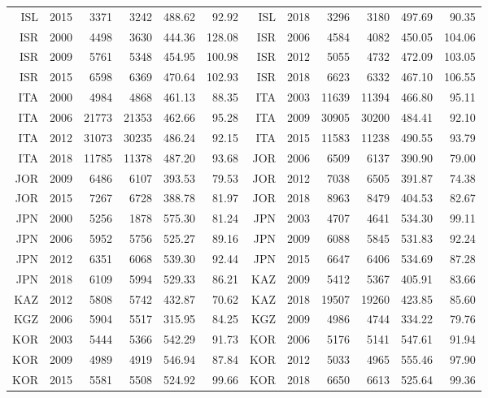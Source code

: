 {\begin{longtable}{r|r|r|r|r|r||r|r|r|r|r|r}
    ISL   & 2015  & 3371  & 3242  & 488.62 & 92.92 & ISL   & 2018  & 3296  & 3180  & 497.69 & 90.35 \\
    ISR   & 2000  & 4498  & 3630  & 444.36 & 128.08 & ISR   & 2006  & 4584  & 4082  & 450.05 & 104.06 \\
    ISR   & 2009  & 5761  & 5348  & 454.95 & 100.98 & ISR   & 2012  & 5055  & 4732  & 472.09 & 103.05 \\
    ISR   & 2015  & 6598  & 6369  & 470.64 & 102.93 & ISR   & 2018  & 6623  & 6332  & 467.10 & 106.55 \\
    ITA   & 2000  & 4984  & 4868  & 461.13 & 88.35 & ITA   & 2003  & 11639 & 11394 & 466.80 & 95.11 \\
    ITA   & 2006  & 21773 & 21353 & 462.66 & 95.28 & ITA   & 2009  & 30905 & 30200 & 484.41 & 92.10 \\
    ITA   & 2012  & 31073 & 30235 & 486.24 & 92.15 & ITA   & 2015  & 11583 & 11238 & 490.55 & 93.79 \\
    ITA   & 2018  & 11785 & 11378 & 487.20 & 93.68 & JOR   & 2006  & 6509  & 6137  & 390.90 & 79.00 \\
    JOR   & 2009  & 6486  & 6107  & 393.53 & 79.53 & JOR   & 2012  & 7038  & 6505  & 391.87 & 74.38 \\
    JOR   & 2015  & 7267  & 6728  & 388.78 & 81.97 & JOR   & 2018  & 8963  & 8479  & 404.53 & 82.67 \\
    JPN   & 2000  & 5256  & 1878  & 575.30 & 81.24 & JPN   & 2003  & 4707  & 4641  & 534.30 & 99.11 \\
    JPN   & 2006  & 5952  & 5756  & 525.27 & 89.16 & JPN   & 2009  & 6088  & 5845  & 531.83 & 92.24 \\
    JPN   & 2012  & 6351  & 6068  & 539.30 & 92.44 & JPN   & 2015  & 6647  & 6406  & 534.69 & 87.28 \\
    JPN   & 2018  & 6109  & 5994  & 529.33 & 86.21 & KAZ   & 2009  & 5412  & 5367  & 405.91 & 83.66 \\
    KAZ   & 2012  & 5808  & 5742  & 432.87 & 70.62 & KAZ   & 2018  & 19507 & 19260 & 423.85 & 85.60 \\
    KGZ   & 2006  & 5904  & 5517  & 315.95 & 84.25 & KGZ   & 2009  & 4986  & 4744  & 334.22 & 79.76 \\
    KOR   & 2003  & 5444  & 5366  & 542.29 & 91.73 & KOR   & 2006  & 5176  & 5141  & 547.61 & 91.94 \\
    KOR   & 2009  & 4989  & 4919  & 546.94 & 87.84 & KOR   & 2012  & 5033  & 4965  & 555.46 & 97.90 \\
    KOR   & 2015  & 5581  & 5508  & 524.92 & 99.66 & KOR   & 2018  & 6650  & 6613  & 525.64 & 99.36 \\

\end{longtable}}
